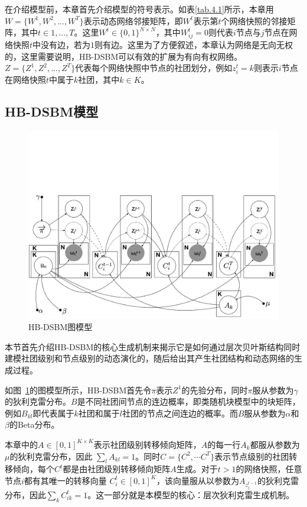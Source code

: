 在介绍模型前，本章首先介绍模型的符号表示。如表\ref{tab.4.1}所示，本章用$W=\{W^1,W^2,...,W^T\}$表示动态网络邻接矩阵，即$W^t$表示第$t$个网络快照的邻接矩阵，其中$t \in 1,...,T$。这里$W^t \in \{0,1\}^{N\times N}$，其中$W_{ij}^t = 0$则代表$i$节点与$j$节点在网络快照$t$中没有边，若为$1$则有边。这里为了方便叙述，本章认为网络是无向无权的，这里需要说明，HB-DSBM可以有效的扩展为有向有权网络。$Z = \{Z^1,Z^2,...,Z^T\}$代表每个网络快照中节点的社团划分，例如$z_i^t = k$则表示$i$节点在网络快照$t$中属于$k$社团，其中$k\in K$。

\subsection{HB-DSBM模型}

\begin{figure}[!htbp]
	\setlength{\abovecaptionskip}{0pt} 
	\setlength{\belowcaptionskip}{10pt} 
	\includegraphics[width=.9\textwidth]{./figure/graph-model_v3_cuted.pdf}
	\caption{HB-DSBM图模型}
	\label{fig.4.1}
\end{figure}

本节首先介绍HB-DSBM的核心生成机制来揭示它是如何通过层次贝叶斯结构同时建模社团级别和节点级别的动态演化的，随后给出其产生社团结构和动态网络的生成过程。

如图~\ref{fig.4.1}的图模型所示，HB-DSBM首先令$\pi$表示$Z^1$的先验分布，同时$\pi$服从参数为$\gamma$的狄利克雷分布。$B$是不同社团间节点的连边概率，即类随机块模型中的块矩阵，例如$B_{kl}$即代表属于$k$社团和属于$l$社团的节点之间连边的概率。而$B$服从参数为$\alpha$和$\beta$的Beta分布。

本章中的$A \in [0, 1]^{K \times K}$表示社团级别转移倾向矩阵，$A$的每一行$A_k$都服从参数为$\mu$的狄利克雷分布，因此 $\sum_l A_{kl} = 1$。同时$C = \{ C^2, \cdots C^T \}$表示节点级别的社团转移倾向，每个$C^t$都是由社团级别转移倾向矩阵$A$生成。对于$t>1$的网络快照，任意节点$i$都有其唯一的转移向量 $C_i^t  \in [0, 1]^K$，该向量服从以参数为$A_{z_i^{t-1}}$的狄利克雷分布，因此$\sum_{k} C_{ik}^t = 1$。这一部分就是本模型的核心：层次狄利克雷生成机制。

